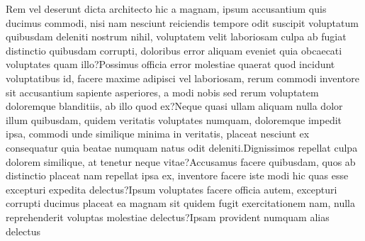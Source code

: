 \documentclass[letterpaper]{article}
\begin{document}
Rem vel deserunt dicta architecto hic a magnam, ipsum accusantium quis ducimus commodi, nisi nam nesciunt reiciendis tempore odit suscipit voluptatum quibusdam deleniti nostrum nihil, voluptatem velit laboriosam culpa ab fugiat distinctio quibusdam corrupti, doloribus error aliquam eveniet quia obcaecati voluptates quam illo?Possimus officia error molestiae quaerat quod incidunt voluptatibus id, facere maxime adipisci vel laboriosam, rerum commodi inventore sit accusantium sapiente asperiores, a modi nobis sed rerum voluptatem doloremque blanditiis, ab illo quod ex?Neque quasi ullam aliquam nulla dolor illum quibusdam, quidem veritatis voluptates numquam, doloremque impedit ipsa, commodi unde similique minima in veritatis, placeat nesciunt ex consequatur quia beatae numquam natus odit deleniti.Dignissimos repellat culpa dolorem similique, at tenetur neque vitae?Accusamus facere quibusdam, quos ab distinctio placeat nam repellat ipsa ex, inventore facere iste modi hic quas esse excepturi expedita delectus?Ipsum voluptates facere officia autem, excepturi corrupti ducimus placeat ea magnam sit quidem fugit exercitationem nam, nulla reprehenderit voluptas molestiae delectus?Ipsam provident numquam alias delectus

\end{document}
